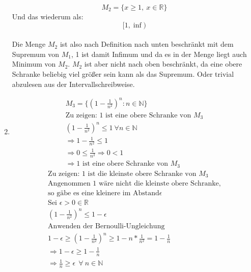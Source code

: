 \documentclass{article}
\begin{document}
\begin{enumerate}[label = (\alph*)]
                \[
                    M_2 = \{x \geq 1, \: x \in \mathbb{R}\}    
                \]
                Und das wiederum als: \\
                \[[1,\inf)\] \\
                Die Menge \(M_2\) ist also nach Definition nach unten beschränkt mit dem Supremum von \(M_1\),
                1 ist damit Infimum und da es in der Menge liegt auch Minimum von \(M_2\).
                \(M_2\) ist aber nicht nach oben beschränkt, da eine obere Schranke beliebig viel größer sein kann
                als das Supremum. Oder trivial abzulesen aus der Intervallschreibweise.

                \item 
                \begin{gather*}
                    M_3 = \{{\left(1- \frac{1}{n^2}\right)}^n: n \in \mathbb{N} \} \\
                    \text{Zu zeigen: 1 ist eine obere Schranke von } M_3 \\
                    {\left(1- \frac{1}{n^2}\right)}^n \leq 1 \: \forall n \in \mathbb{N} \\
                    \Rightarrow 1- \frac{1}{n^2} \leq 1 \\
                    \Rightarrow 0 \leq \frac{1}{n^2} \Rightarrow 0 < 1 \\
                    \Rightarrow \text{1 ist eine obere Schranke von } M_3
                \end{gather*} 
                \begin{gather*}
                    \text{Zu zeigen: 1 ist die kleinste obere Schranke von } M_3 \\
                    \text{Angenommen 1 wäre nicht die kleinste obere Schranke,} \\
                    \text{so gäbe es eine kleinere im Abstand} \epsilon \\
                    \text{Sei } \epsilon > 0 \in \mathbb{R} \\
                    {\left(1- \frac{1}{n^2}\right)}^n \leq 1 - \epsilon \\
                    \text{Anwenden der Bernoulli-Ungleichung} \\
                    1 - \epsilon \geq {\left(1- \frac{1}{n^2}\right)}^n \geq 1 - n * \frac{1}{n^2} = 1 - \frac{1}{n} \\
                    \Rightarrow 1- \epsilon \geq 1 - \frac{1}{n} \\
                    \Rightarrow \frac{1}{n} \geq \epsilon \:\: \forall \: n \in \mathbb{N}\\

\end{gather*}
\end{enumerate}
\end{document}
